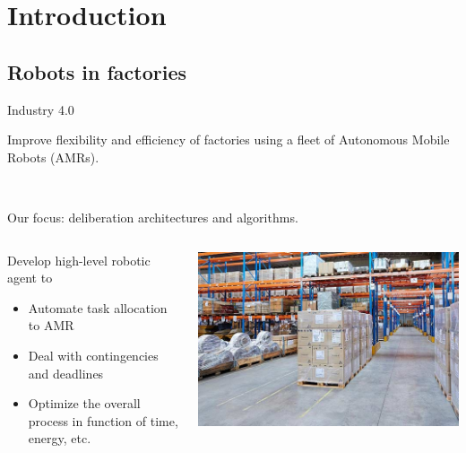 \section{Introduction}
\subsection{Robots in factories}

\begin{frame}{Industry 4.0}
    \centering

    Improve flexibility and efficiency of factories using a fleet of Autonomous Mobile Robots (AMRs).

    ~~

    \pause

    Our focus: deliberation architectures and algorithms.

\begin{columns}
    \begin{column}{0.6\textwidth}
        \pause
        Develop high-level robotic agent to
        \begin{itemize}
            \pause
            \item Automate task allocation to AMR
            \pause
            \item Deal with contingencies and deadlines
            \pause
            \item Optimize the overall process in function of time, energy, etc.
        \end{itemize}
    \end{column}
    \begin{column}{0.4\textwidth}
        \includegraphics[width = \textwidth]{images/logisticsolutions.jpg}
    \end{column}
\end{columns}
\end{frame}

